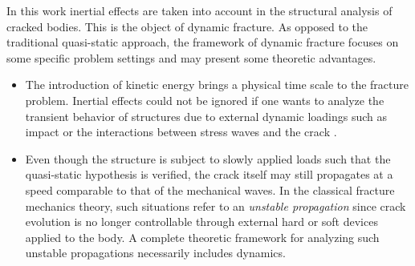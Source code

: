 In this work inertial effects are taken into account in the structural analysis of cracked bodies. This is the object of dynamic fracture. As opposed to the traditional quasi-static approach, the framework of dynamic fracture focuses on some specific problem settings and may present some theoretic advantages.
\begin{itemize}
\item The introduction of kinetic energy brings a physical time scale to the fracture problem. Inertial effects could not be ignored if one wants to analyze the transient behavior of structures due to external dynamic loadings such as impact or the interactions between stress waves and the crack \cite{Ravi-ChandarKnauss:1984b}.

\item Even though the structure is subject to slowly applied loads such that the quasi-static hypothesis is verified, the crack itself may still propagates at a speed comparable to that of the mechanical waves. In the classical fracture mechanics theory, such situations refer to an \emph{unstable propagation} since crack evolution is no longer controllable through external hard or soft devices applied to the body. A complete theoretic framework for analyzing such unstable propagations necessarily includes dynamics.
\end{itemize}

